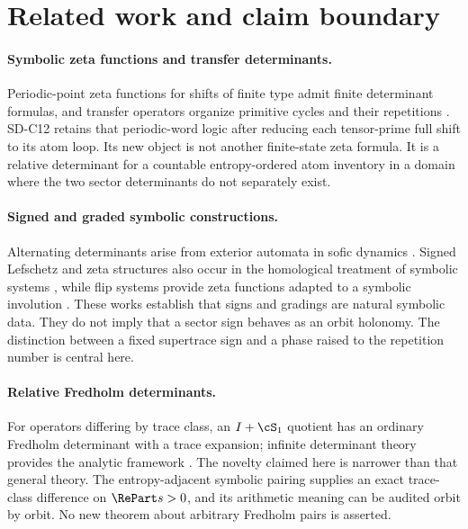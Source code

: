 \section{Related work and claim boundary}
\label{sec:related}

\paragraph{Symbolic zeta functions and transfer determinants.}
Periodic-point zeta functions for shifts of finite type admit finite
determinant formulas, and transfer operators organize primitive cycles and
their repetitions \citep{bowenlanford1970,ruelle1976}.  SD-C12 retains that
periodic-word logic after reducing each tensor-prime full shift to its atom
loop.  Its new object is not another finite-state zeta formula.  It is a
relative determinant for a countable entropy-ordered atom inventory in a
domain where the two sector determinants do not separately exist.

\paragraph{Signed and graded symbolic constructions.}
Alternating determinants arise from exterior automata in sofic dynamics
\citep{beal1995}.  Signed Lefschetz and zeta structures also occur in the
homological treatment of symbolic systems \citep{deeley2018}, while flip
systems provide zeta functions adapted to a symbolic involution
\citep{kimleepark2003}.  These works establish that signs and gradings are
natural symbolic data.  They do not imply that a sector sign behaves as an
orbit holonomy.  The distinction between a fixed supertrace sign and a phase
raised to the repetition number is central here.

\paragraph{Relative Fredholm determinants.}
For operators differing by trace class, an $I+\cS_1$ quotient has an ordinary
Fredholm determinant with a trace expansion; infinite determinant theory
provides the analytic framework \citep{simon1977}.  The novelty claimed here
is narrower than that general theory.  The entropy-adjacent symbolic pairing
supplies an exact trace-class difference on $\RePart s>0$, and its arithmetic
meaning can be audited orbit by orbit.  No new theorem about arbitrary
Fredholm pairs is asserted.

